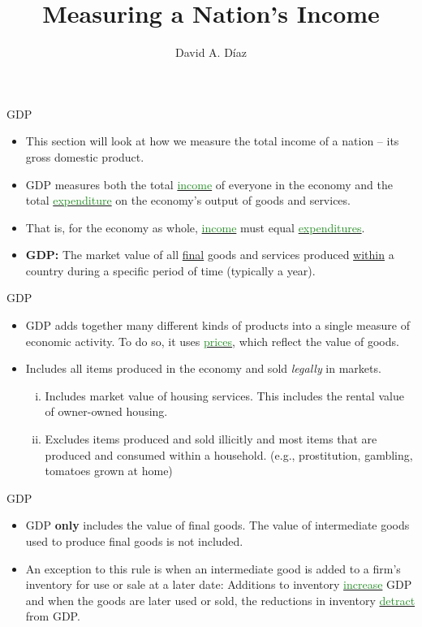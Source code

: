 \documentclass[xcolor={dvipsnames},pdf, hyperref={colorlinks=true, citecolor=ForestGreen, linkcolor=BlueViolet, urlcolor=Magenta}]{beamer}
\title{Measuring a Nation's Income}
\author{David A. D\'iaz}
\institute{UNC Chapel Hill}
\date{}
\theoremstyle{definition}
\newcommand{\defn}[1]{\textbf{#1}}
\newcommand{\dd}[1]{{\underline{\textcolor{ForestGreen}{#1}}}}
\begin{document}
 
	
	\begin{frame}
		
		\titlepage
		
	\end{frame}



\begin{frame}{GDP}
\begin{itemize}
	\item This section will look at how we measure the total income of a nation -- its gross domestic product. 
	\item GDP measures both the total \dd{income} of everyone in the economy and the total \dd{expenditure} on the economy's output of goods and services. 
	\item That is, for the economy as whole, \dd{income} must equal \dd{expenditures}. 
	\item \defn{GDP:} The market value of all \underline{final} goods and services produced \underline{within} a country during a specific period of time (typically a year).
\end{itemize}
\end{frame}

\begin{frame}{GDP}
\begin{itemize}
	\item GDP adds together many different kinds of products into a single measure of economic activity. To do so, it uses \dd{prices}, which reflect the value of goods.
	\item Includes all items produced in the economy and sold \textit{legally} in markets.
	\begin{enumerate}[i.]
		\item Includes market value of housing services. This includes the rental value of owner-owned housing.
		\item Excludes items produced and sold illicitly and most items that are produced and consumed within a household. (e.g., prostitution, gambling, tomatoes grown at home)
	\end{enumerate}
\end{itemize}
\end{frame}

\begin{frame}{GDP}
\begin{itemize}
	\item GDP \textbf{only} includes the value of final goods. The value of intermediate goods used to produce final goods is not included. 
	\item An exception to this rule is when an intermediate good is added to a firm's inventory for use or sale at a later date: Additions to inventory \dd{increase} GDP and when the goods are later used or sold, the reductions in inventory \dd{detract} from GDP.
\end{itemize}
\end{frame}
\end{document}

